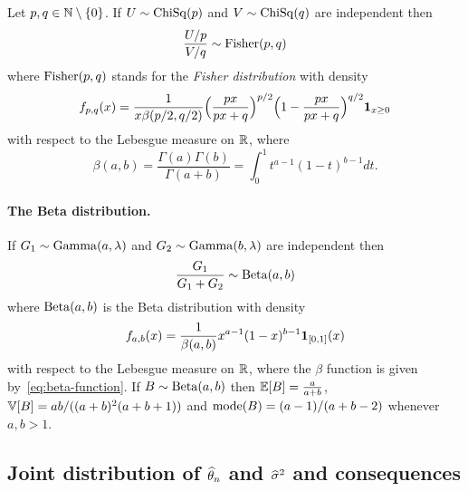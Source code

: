 Let $p, q \in \mathbb N \setminus \{ 0 \} $. If $U \sim \operatorname{ChiSq}(p)$ and $V \sim \operatorname{ChiSq}(q)$ are independent then
\begin{equation}
	\label{eq:fisher-definition}
	\frac{U / p}{V / q} \sim \operatorname{Fisher}(p, q)
\end{equation}
where $\operatorname{Fisher}(p, q)$ stands for the \emph{Fisher distribution} with density
\begin{equation*}
	f_{p, q}(x) = \frac{1}{x \beta(p/2, q/2)} \Big( \frac{px}{px + q} \Big)^{p/2} \Big(1 - \frac{px}{px + q} \Big)^{q/2} \mathbf 1_{x \geq 0}
\end{equation*}
with respect to the Lebesgue measure on $\mathbb R$, where
\begin{equation}
	\label{eq:beta-function}
	\beta(a, b) = \frac{\Gamma(a) \Gamma(b)}{\Gamma(a + b)}  = \int_0^1 t^{a-1} (1 - t)^{b - 1} dt.
\end{equation}

\paragraph{The Beta distribution.} %

If $G_1 \sim \operatorname{Gamma}(a, \lambda)$ and $G_2 \sim \operatorname{Gamma}(b, \lambda)$ are independent then
\begin{equation*}
	\frac{G_1}{G_1 + G_2} \sim \operatorname{Beta}(a, b)
\end{equation*}
where $\operatorname{Beta}(a, b)$ is the Beta distribution with density
\begin{equation*}
	f_{a, b}(x) = \frac{1}{\beta(a, b)} x^{a - 1} (1 - x)^{b - 1} \mathbf 1_{[0, 1]}(x)
\end{equation*}
with respect to the Lebesgue measure on $\mathbb R$, where the $\beta$ function is given by~\eqref{eq:beta-function}.
If $B \sim \operatorname{Beta}(a, b)$ then $\mathbb E[B] = \frac{a}{a + b}$, $\mathbb V[B] = ab / ((a + b)^2 (a + b + 1))$ and $\operatorname{mode}(B) = (a - 1) / (a + b - 2)$ whenever $a, b > 1$.


\subsection{Joint distribution of $\widehat \theta_n$ and $\widehat \sigma^2$ and consequences}



